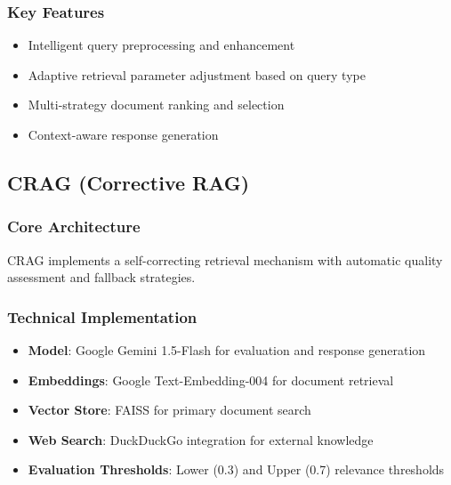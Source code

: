 \documentclass[12pt,a4paper]{article}
\begin{document}
\subsubsection{Key Features}
\begin{itemize}
    \item Intelligent query preprocessing and enhancement
    \item Adaptive retrieval parameter adjustment based on query type
    \item Multi-strategy document ranking and selection
    \item Context-aware response generation
\end{itemize}

\subsection{CRAG (Corrective RAG)}

\subsubsection{Core Architecture}
CRAG implements a self-correcting retrieval mechanism with automatic quality assessment and fallback strategies.

\subsubsection{Technical Implementation}
\begin{itemize}
    \item \textbf{Model}: Google Gemini 1.5-Flash for evaluation and response generation
    \item \textbf{Embeddings}: Google Text-Embedding-004 for document retrieval
    \item \textbf{Vector Store}: FAISS for primary document search
    \item \textbf{Web Search}: DuckDuckGo integration for external knowledge
    \item \textbf{Evaluation Thresholds}: Lower (0.3) and Upper (0.7) relevance thresholds
\end{itemize}
\end{document}
